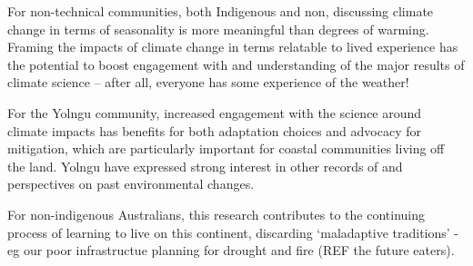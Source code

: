 For non-technical communities, both Indigenous and non, discussing climate 
change in terms of seasonality is more meaningful than degrees of warming.  
Framing the impacts of climate change in terms relatable to lived experience 
has the potential to boost engagement with and understanding of the major 
results of climate science – after all, everyone has some experience of the 
weather!

For the Yolngu community, increased engagement with the science around climate 
impacts has benefits for both adaptation choices and advocacy for mitigation, 
which are particularly important for coastal communities living off the land.  
Yolngu have expressed strong interest in other records of and perspectives on 
past environmental changes.  

For non-indigenous Australians, this research contributes to the continuing 
process of learning to live on this continent, discarding `maladaptive traditions'
- eg our poor infrastructue planning for drought and fire (REF the future eaters).


